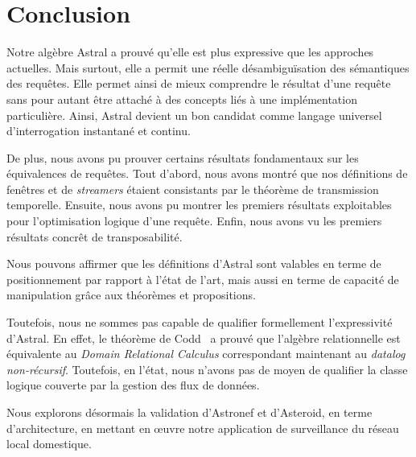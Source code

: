 \section{Conclusion}
Notre algèbre Astral a prouvé qu'elle est plus expressive que les approches actuelles. Mais surtout, elle a permit une réelle désambiguïsation des sémantiques des requêtes. Elle permet ainsi de mieux comprendre le résultat d'une requête sans pour autant être attaché à des concepts liés à une implémentation particulière. Ainsi, Astral devient un bon candidat comme langage universel d'interrogation instantané et continu.

De plus, nous avons pu prouver certains résultats fondamentaux sur les équivalences de requêtes. Tout d'abord, nous avons montré que nos définitions de fenêtres et de \textit{streamers} étaient consistants par le théorème de transmission temporelle. Ensuite, nous avons pu montrer les premiers résultats exploitables pour l'optimisation logique d'une requête. Enfin, nous avons vu les premiers résultats concrêt de transposabilité.

Nous pouvons affirmer que les définitions d'Astral sont valables en terme de positionnement par rapport à l'état de l'art, mais aussi en terme de capacité de manipulation grâce aux théorèmes et propositions.

Toutefois, nous ne sommes pas capable de qualifier formellement l'expressivité d'Astral. En effet, le théorème de Codd~\cite{Codd:theorem} a prouvé que l'algèbre relationnelle est équivalente au \textit{Domain Relational Calculus} correspondant maintenant au \textit{datalog non-récursif}. Toutefois, en l'état, nous n'avons pas de moyen de qualifier la classe logique couverte par la gestion des flux de données.

Nous explorons désormais la validation d'Astronef et d'Asteroid, en terme d'architecture, en mettant en œuvre notre application de surveillance du réseau local domestique.
